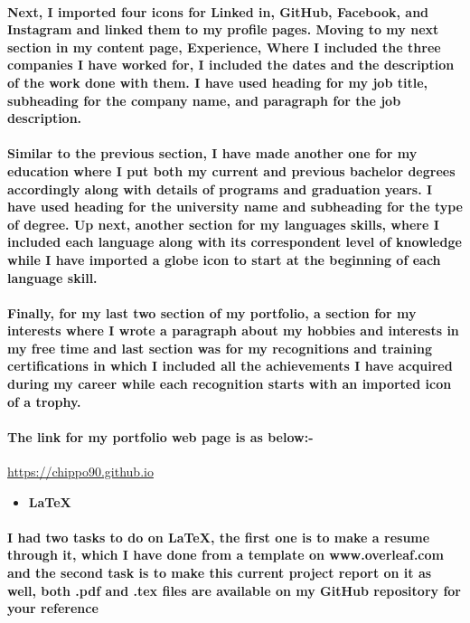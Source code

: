 \documentclass[12pt, letterpaper]{template}
\begin{document}
\paragraph{\Large Next, I imported four icons for Linked in, GitHub, Facebook, and Instagram and linked them to my profile pages. Moving to my next section in my content page, Experience, Where I included the three companies I have worked for, I included the dates and the description of the work done with them. I have used heading for my job title, subheading for the company name, and paragraph for the job description.}

\paragraph{\Large Similar to the previous section, I have made another one for my education where I put both my current and previous bachelor degrees accordingly along with details of programs and graduation years. I have used heading for the university name and subheading for the type of degree. Up next, another section for my languages skills, where I included each language along with its correspondent level of knowledge while I have imported a globe icon to start at the beginning of each language skill.}

\paragraph{\Large Finally, for my last two section of my portfolio, a section for my interests where I wrote a paragraph about my hobbies and interests in my free time and last section was for my recognitions and training certifications in which I included all the achievements I have acquired during my career while each recognition starts with an imported icon of a trophy.}

\paragraph{\Large The link for my portfolio web page is as below:-}
\begin{center}
    \Large\url{https://chippo90.github.io}
\end{center}
\begin{itemize}
\item \Large \textbf{\LaTeX}
\end{itemize}

\paragraph{\Large I had two tasks to do on \LaTeX, the first one is to make a resume through it, which I have done from a template on www.overleaf.com and the second task is to make this current project report on it as well, both .pdf and .tex files are available on my GitHub repository for your reference}
\end{document}
